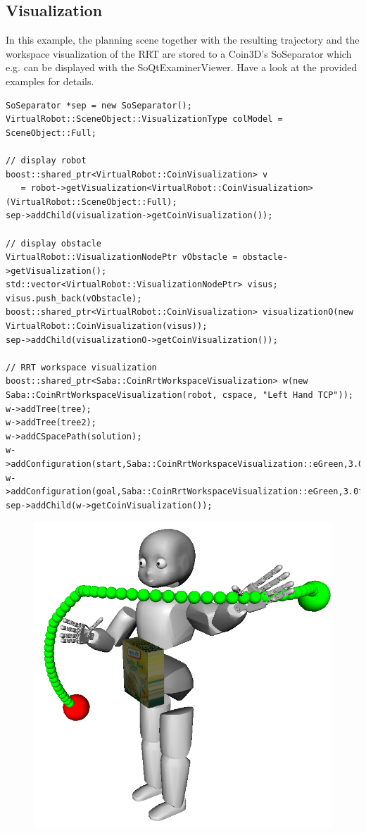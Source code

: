 \documentclass{book}
\begin{document}
\subsection{Visualization}
In this example, the planning scene together with the resulting trajectory and the workspace visualization of the RRT are stored to a Coin3D's SoSeparator which e.g. can be displayed with the SoQtExaminerViewer. Have a look at the provided examples for details.
\begin{lstlisting}
SoSeparator *sep = new SoSeparator();
VirtualRobot::SceneObject::VisualizationType colModel = SceneObject::Full;

// display robot
boost::shared_ptr<VirtualRobot::CoinVisualization> v 
   = robot->getVisualization<VirtualRobot::CoinVisualization>(VirtualRobot::SceneObject::Full);
sep->addChild(visualization->getCoinVisualization());

// display obstacle
VirtualRobot::VisualizationNodePtr vObstacle = obstacle->getVisualization();
std::vector<VirtualRobot::VisualizationNodePtr> visus;
visus.push_back(vObstacle);
boost::shared_ptr<VirtualRobot::CoinVisualization> visualizationO(new VirtualRobot::CoinVisualization(visus));
sep->addChild(visualizationO->getCoinVisualization());

// RRT workspace visualization
boost::shared_ptr<Saba::CoinRrtWorkspaceVisualization> w(new Saba::CoinRrtWorkspaceVisualization(robot, cspace, "Left Hand TCP"));
w->addTree(tree);
w->addTree(tree2);
w->addCSpacePath(solution);
w->addConfiguration(start,Saba::CoinRrtWorkspaceVisualization::eGreen,3.0f);
w->addConfiguration(goal,Saba::CoinRrtWorkspaceVisualization::eGreen,3.0f);
sep->addChild(w->getCoinVisualization());
\end{lstlisting}
\begin{figure}[H]
	\centering
	\includegraphics[scale = 0.3]{PlanningBiRrt2}
\end{figure}
\end{document}
